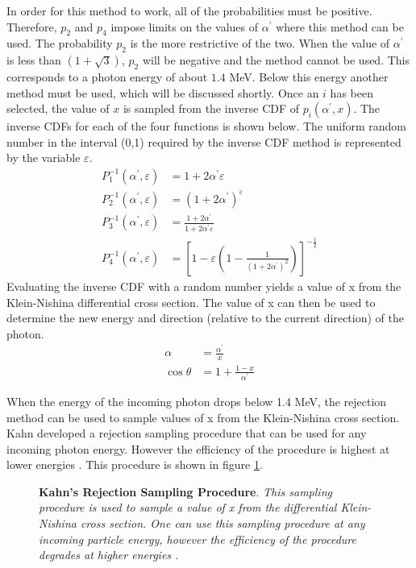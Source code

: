In order for this method to work, all of the probabilities must be positive.
Therefore, $p_2$ and $p_4$ impose limits on the values of $\alpha^{'}$ where this
method can be used. The probability $p_2$ is the more restrictive of the two.
When the value of $\alpha^{'}$ is less than $(1 + \sqrt{3})$, $p_2$ will be 
negative and the method cannot be used. This corresponds to a photon energy of
about $1.4$ MeV. Below this energy another method must be used, which will be 
discussed shortly. Once an $i$ has been selected, the value of $x$ is sampled
from the inverse CDF of $p_i(\alpha^{'},x)$. The inverse CDFs for each of the
four functions is shown below. The uniform random number in the interval (0,1)
required by the inverse CDF method is represented by the variable 
$\varepsilon$.
\begin{align}
  P_1^{-1}(\alpha^{'},\varepsilon) & = 1 + 2\alpha^{'}\varepsilon \\
  P_2^{-1}(\alpha^{'},\varepsilon) & = (1 + 2\alpha^{'})^{\varepsilon} \\
  P_3^{-1}(\alpha^{'},\varepsilon) & = \frac{1 + 2\alpha^{'}}
  {1 + 2\alpha^{'}\varepsilon} \\
  P_4^{-1}(\alpha^{'},\varepsilon) & = \left[1 - \varepsilon\left(1 - 
    \frac{1}{(1 + 2\alpha^{'})^2} \right) \right]^{-\frac{1}{2}}
\end{align}
Evaluating the inverse CDF with a random number yields a value of x from the
Klein-Nishina differential cross section. The value of x can then be used to
determine the new energy and direction (relative to the current direction) of 
the photon.
\begin{align}
  \alpha & = \frac{\alpha^{'}}{x} \\
  \cos{\theta} & = 1 + \frac{1-x}{\alpha^{'}} 
\end{align}

When the energy of the incoming photon drops below 1.4 MeV, the rejection
method can be used to sample values of x from the Klein-Nishina cross section.
Kahn developed a rejection sampling procedure that can be used for any incoming
photon energy. However the efficiency of the procedure is highest at lower 
energies \citep{lux_monte_1991, kahn_applications_1956}. This procedure is
shown in figure \ref{fig:kahn_rejection_sampling}.
\begin{figure}[t!]
  \begin{center}
    \def\svgwidth{300bp}
    
  \end{center}
  \caption{\textbf{Kahn's Rejection Sampling Procedure}.
    \textit{This sampling procedure is used to sample a value of x from the
    differential Klein-Nishina cross section. One can use this sampling
    procedure at any incoming particle energy, however the efficiency of the
    procedure degrades at higher energies \citep{lux_monte_1991}.}}
  \label{fig:kahn_rejection_sampling}
\end{figure}

